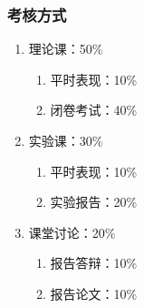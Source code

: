 \begin{frame}
  \frametitle{考核方式}
  \begin{enumerate}
    \item 理论课：50\%
      \begin{enumerate}
        \item 平时表现：10\%
        \item 闭卷考试：40\%
      \end{enumerate}
    \item 实验课：30\%
      \begin{enumerate}
        \item 平时表现：10\%
        \item 实验报告：20\%
      \end{enumerate}
    \item 课堂讨论：20\%
      \begin{enumerate}
        \item 报告答辩：10\%
        \item 报告论文：10\%
      \end{enumerate}
  \end{enumerate}
\end{frame}

